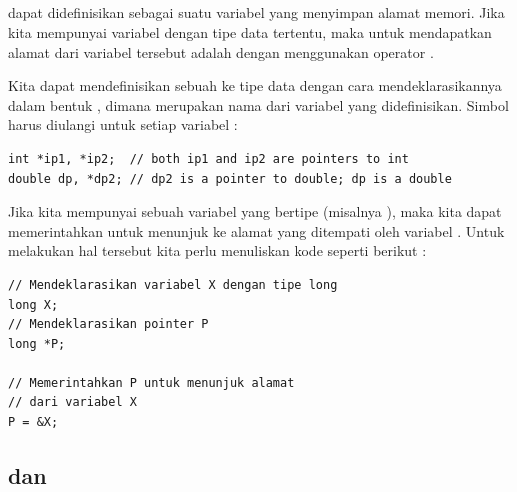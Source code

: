 \documentclass[../main.tex]{subfiles}
\begin{document}
\subsection{\Pointer}

{\Pointer} dapat didefinisikan sebagai suatu variabel yang menyimpan alamat memori. Jika kita mempunyai variabel dengan tipe data tertentu, maka untuk mendapatkan alamat dari variabel tersebut adalah dengan menggunakan operator \citecode{\&} \parencite{raharjo2015pemrograman}.

Kita dapat mendefinisikan sebuah {\pointer} ke tipe data dengan cara mendeklarasikannya dalam bentuk , dimana  merupakan nama dari variabel yang didefinisikan. Simbol \citecode{*} harus diulangi untuk setiap variabel {\pointer} \parencite{Lippman_Lajoie_Moo_2013}:

\begin{code}
\begin{verbatim}
int *ip1, *ip2;  // both ip1 and ip2 are pointers to int
double dp, *dp2; // dp2 is a pointer to double; dp is a double
\end{verbatim}
\end{code}

Jika kita mempunyai sebuah variabel yang bertipe  (misalnya ), maka kita dapat memerintahkan {\pointer}  untuk menunjuk ke alamat yang ditempati oleh variabel . Untuk melakukan hal tersebut kita perlu menuliskan kode seperti berikut \parencite{raharjo2015pemrograman}:

\begin{code}
\begin{verbatim}
// Mendeklarasikan variabel X dengan tipe long
long X;
// Mendeklarasikan pointer P
long *P;

// Memerintahkan P untuk menunjuk alamat
// dari variabel X
P = &X;
\end{verbatim}
\end{code}

\subsection{{\Dereference} dan {\Reference}}
\end{document}
